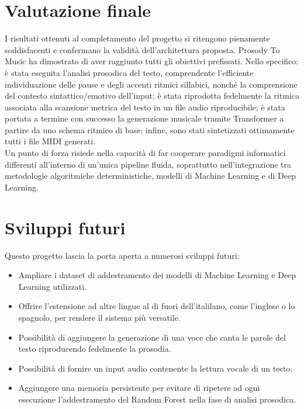\section{Valutazione finale}
I risultati ottenuti al completamento del progetto si ritengono pienamente soddisfacenti e confermano la validità dell'architettura proposta. 
Prosody To Music ha dimostrato di aver raggiunto tutti gli obiettivi prefissati. Nello specifico: è stata eseguita l'analisi prosodica del testo, 
comprendente l'efficiente individuazione delle pause e degli accenti ritmici sillabici, nonché la comprensione del contesto sintattico/emotivo dell'input; 
è stata riprodotta fedelmente la ritmica associata alla scansione metrica del testo in un file audio riproducibile; è stata portata a termine con successo 
la generazione musicale tramite Transformer a partire da uno schema ritmico di base; infine, sono stati sintetizzati ottimamente tutti i file MIDI generati.\\
Un punto di forza risiede nella capacità di far cooperare paradigmi informatici differenti all'interno di un'unica pipeline fluida, soprattutto 
nell'integrazione tra metodologie algoritmiche deterministiche, modelli di Machine Learning e di Deep Learning. 


\section{Sviluppi futuri}
Questo progetto lascia la porta aperta a numerosi sviluppi futuri:
\begin{itemize}
    \item Ampliare i dataset di addestramento dei modelli di Machine Learning e Deep Learning utilizzati.
    \item Offrire l'estensione ad altre lingue al di fuori dell'italilano, come l'inglese o lo spagnolo, per rendere il sistema più versatile.
    \item Possibilità di aggiungere la generazione di una voce che canta le parole del testo riproducendo fedelmente la prosodia.
    \item Possibilità di fornire un input audio contenente la lettura vocale di un testo.
    \item Aggiungere una memoria persistente per evitare di ripetere ad ogni esecuzione l'addestramento del Random Forest nella fase di analisi prosodica. 
\end{itemize}


